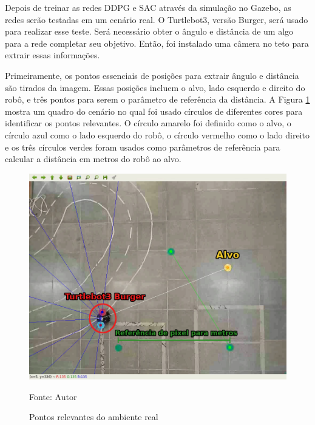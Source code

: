 Depois de treinar as redes DDPG e SAC através da simulação no Gazebo, as redes serão testadas em um cenário real.
O Turtlebot3, versão Burger, será usado para realizar esse teste.
Será necessário obter o ângulo e distância de um algo para a rede completar seu objetivo.
Então, foi instalado uma câmera no teto para extrair essas informações.

Primeiramente, os pontos essenciais de posições para extrair ângulo e distância são tirados da imagem.
Essas posições incluem o alvo, lado esquerdo e direito do robô, e três pontos para serem o parâmetro de referência da distância.
A Figura \ref{fig:pixel_to_meter} mostra um quadro do cenário no qual foi usado círculos de diferentes cores para identificar os pontos relevantes.
O círculo amarelo foi definido como o alvo, o círculo azul como o lado esquerdo do robô, o círculo vermelho como o lado direito e os três círculos verdes foram usados como parâmetros de referência para calcular a distância em metros do robô ao alvo.

\vspace{0.25cm}
\begin{figure}[H]
\caption{Pontos relevantes do ambiente real}
\centerline{\includegraphics[width=14cm]{imagens/pixel_to_meter.png}}
\small{Fonte: Autor}
\label{fig:pixel_to_meter}
\end{figure}

